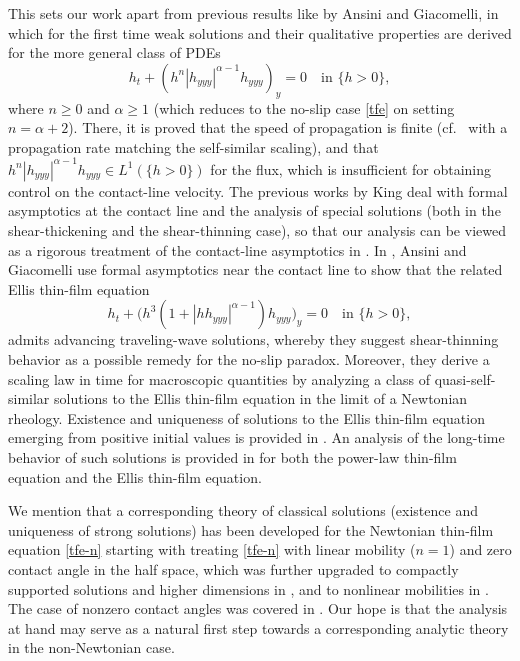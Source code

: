 \documentclass[reqno,12pt]{amsart}
\numberwithin{equation}{section}
\begin{document}
This sets our work apart from previous results like \cite{AnsiniGiacomelli2004} by Ansini and Giacomelli, in which for the first time weak solutions and their qualitative properties are derived for the more general class of PDEs
%
\[
h_t + (h^n |h_{yyy}|^{\alpha-1} h_{yyy})_y = 0 \quad \text{in } \{h > 0\},
\]
%
where $n \ge 0$ and $\alpha \ge 1$ (which reduces to the no-slip case \eqref{tfe} on setting $n = \alpha+2$). There, it is proved that the speed of propagation is finite (cf.~\cite[Theorem~2]{AnsiniGiacomelli2004} with a propagation rate matching the self-similar scaling), and that $h^n |h_{yyy}|^{\alpha-1} h_{yyy} \in L^1(\{h > 0\})$ for the flux, which is insufficient for obtaining control on the contact-line velocity. The previous works \cite{King2001,King_2001} by King deal with formal asymptotics at the contact line and the analysis of special solutions (both in the shear-thickening and the shear-thinning case), so that our analysis can be viewed as a rigorous treatment of the contact-line asymptotics in \cite{King2001,King_2001}. In \cite{ansini_giacomelli_2002}, Ansini and Giacomelli use formal asymptotics near the contact line to show that the related Ellis thin-film equation
\begin{equation*}
    h_t + \bigl(h^3 (1 + |hh_{yyy}|^{\alpha-1}) h_{yyy})_y = 0 \quad \text{in } \{h > 0\},
\end{equation*}
admits advancing traveling-wave solutions, whereby they suggest shear-thinning behavior as a possible remedy for the no-slip paradox. Moreover, they derive a scaling law in time for macroscopic quantities by analyzing a class of quasi-self-similar solutions to the Ellis thin-film equation in the limit of a Newtonian rheology. Existence and uniqueness of solutions to the Ellis thin-film equation emerging from positive initial values is provided in \cite{LienstrombergMueller2020}. An analysis of the long-time behavior of such solutions is provided in \cite{jansen_lienstromberg_nik2023} for both the power-law thin-film equation and the Ellis thin-film equation.

%
\bigskip
%

We mention that a corresponding theory of classical solutions (existence and uniqueness of strong solutions) has been developed for the Newtonian thin-film equation \eqref{tfe-n} starting with \cite{GiacomelliKnuepferOtto2008,BringmannGiacomelliKnuepferOtto2016,GnannIbrahimMasmoudi2019} treating \eqref{tfe-n} with linear mobility ($n = 1$) and zero contact angle in the half space, which was further upgraded to compactly supported solutions and higher dimensions in \cite{Gnann2015,John2015,Seis2018}, and to nonlinear mobilities in \cite{GiacomelliGnannKnuepferOtto2014,Gnann2016,GnannPetrache2018,GnannWisse2025}. The case of nonzero contact angles was covered in \cite{Knuepfer2011,Knuepfer2015}. Our hope is that the analysis at hand may serve as a natural first step towards a corresponding analytic theory in the non-Newtonian case.
\end{document}
